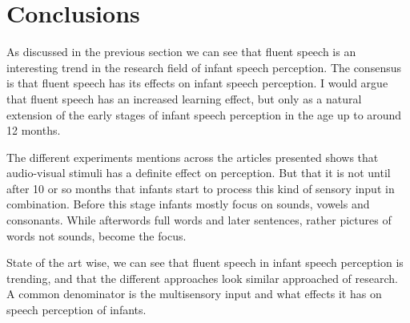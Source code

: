 \documentclass[12pt, a4paper]{article}
\begin{document}
\section{Conclusions}\label{conclusions}


As discussed in the previous section we can see that fluent speech is an
interesting trend in the research field of infant speech perception.
The consensus is that fluent speech has its effects on infant speech
perception. I would argue that fluent speech has an increased learning effect, but only as
a natural extension of the early stages of infant speech perception in the age
up to around 12 months. 

The different experiments mentions across the articles presented shows that
audio-visual stimuli has a definite effect on perception. But that it is not
until after 10 or so months that infants start to process this kind of sensory
input in combination. Before this stage infants mostly focus on sounds, vowels
and consonants. While afterwords full words and later sentences, rather
pictures of words not sounds, become the focus.    
 
State of the art wise, we can see that fluent speech in infant speech
perception is trending, and that the different approaches look similar
approached of research. A common denominator is the multisensory input and what
effects it has on speech perception of infants. 
\end{document}
